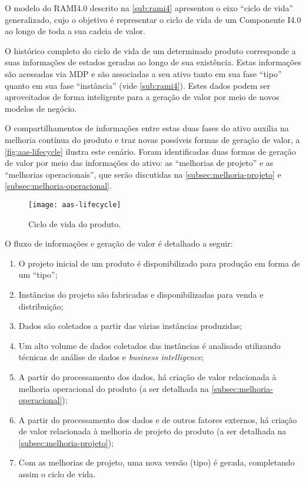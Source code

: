 O modelo do RAMI4.0 descrito na \autoref{sub:rami4} apresentou o eixo ``ciclo de vida'' generalizado, cujo o objetivo é representar o ciclo de vida de um Componente I4.0 ao longo de toda a sua cadeia de valor.

O histórico completo do ciclo de vida de um determinado produto corresponde a suas informações de estados geradas ao longo de sua existência. Estas informações são acessadas via MDP e são associadas a seu ativo tanto em sua fase ``tipo'' quanto em sua fase ``instância'' (vide \autoref{sub:rami4}). Estes dados podem ser aproveitados de forma inteligente para a geração de valor por meio de novos modelos de negócio.

O compartilhamentos de informações entre estas duas fases do ativo auxilia na melhoria contínua do produto e traz novas possíveis formas de geração de valor, a \autoref{fig:aas-lifecycle} ilustra este cenário. Foram identificadas duas formas de geração de valor por meio das informações do ativo: as ``melhorias de projeto'' e as ``melhorias operacionais'', que serão discutidas na \autoref{subsec:melhoria-projeto} e \autoref{subsec:melhoria-operacional}.

\begin{figure}[htb!]
	\centering
	\texttt{[image: aas-lifecycle]}
	\caption{Ciclo de vida do produto.}
	\label{fig:aas-lifecycle}
\end{figure}

O fluxo de informações e geração de valor é detalhado a seguir:

\begin{enumerate}[label=(\alph*)]
	\item O projeto inicial de um produto é disponibilizado para produção em forma de um ``tipo'';
	\item Instâncias do projeto são fabricadas e disponibilizadas para venda e distribuição;
	\item Dados são coletados a partir das várias instâncias produzidas;
	\item Um alto volume de dados coletados das instâncias é analisado utilizando técnicas de análise de dados e \textit{business intelligence};
	\item A partir do processamento dos dados, há criação de valor relacionada à melhoria operacional do produto (a ser detalhada na \autoref{subsec:melhoria-operacional});
	\item A partir do processamento dos dados e de outros fatores externos, há criação de valor relacionada à melhoria de projeto do produto (a ser detalhada na \autoref{subsec:melhoria-projeto});
	\item Com as melhorias de projeto, uma nova versão (tipo) é gerada, completando assim o ciclo de vida.
\end{enumerate}

